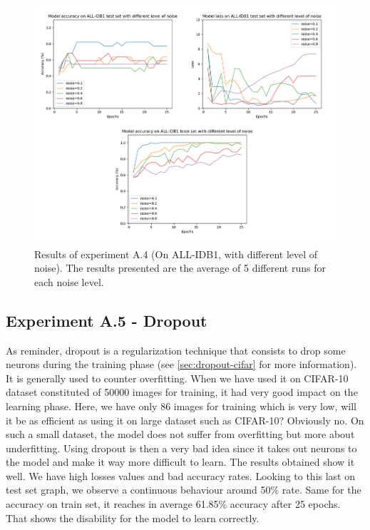 \documentclass[11pt, openany]{report}
\theoremstyle{plain}
\theoremstyle{definition}
\theoremstyle{remark}
\begin{document}
\begin{figure}[H]
  \centering
  \includegraphics[scale=0.5]{Code/ch6-LeukemiaSubtypes/figures_result/ALL_IDB1/all_idb1-noise.PNG}
  \caption{Results of experiment A.4 (On ALL-IDB1, with different level of noise). The results presented are the average of 5 different runs for each noise level.}
  \label{fig:results-A4}
\end{figure}

\newpage
\subsection{Experiment A.5 - Dropout}
As reminder, dropout is a regularization technique that consists to drop some neurons during the training phase (see \autoref{sec:dropout-cifar} for more information). It is generally used to counter overfitting. When we have used it on CIFAR-10 dataset constituted of 50000 images for training, it had very good impact on the learning phase. Here, we have only 86 images for training which is very low, will it be as efficient as using it on large dataset such as CIFAR-10? Obviously no. On such a small dataset, the model does not suffer from overfitting but more about underfitting. Using dropout is then a very bad idea since it takes out neurons to the model and make it way more difficult to learn. The results obtained show it well. We have high losses values and bad accuracy rates. Looking to this last on test set graph, we observe a continuous behaviour around 50\% rate. Same for the accuracy on train set, it reaches in average 61.85\% accuracy after 25 epochs. That shows the disability for the model to learn correctly.  
\end{document}
